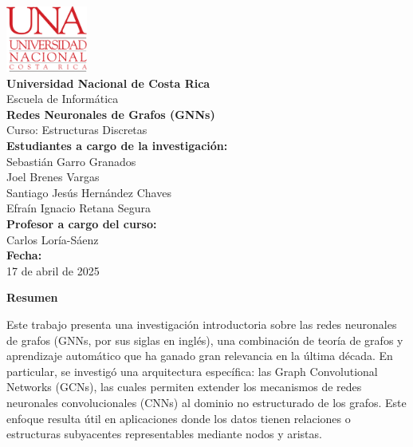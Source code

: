 \documentclass[11pt]{article} %
\begin{document}
\begin{titlepage}
    \thispagestyle{empty}
    \begin{spacing}{1.5}
    \begin{center}
        \includegraphics[width=0.2\textwidth]{Images/LogoUNA.svg.png} \\[30pt]
        {\Large \textbf{Universidad Nacional de Costa Rica}} \\[20pt] 
        {\Large Escuela de Informática} \\[20pt]
        {\Large \textbf{Redes Neuronales de Grafos (GNNs)}} \\[20pt]
        {\Large Curso: Estructuras Discretas} \\[20pt]
        {\Large \textbf{Estudiantes a cargo de la investigación:}} \\[10pt]
        {\large Sebastián Garro Granados \\ Joel Brenes Vargas \\ Santiago Jesús Hernández Chaves \\ Efraín Ignacio Retana Segura} \\[20pt]
        {\Large \textbf{Profesor a cargo del curso:}} \\[15pt]
        {\large Carlos Loría-Sáenz} \\[120pt]
        {\Large \textbf{Fecha:}} \\[15pt]
        {\large 17 de abril de 2025}
    \end{center}
    \end{spacing}
\end{titlepage}

\newpage
{\large \textbf{Resumen}}  
\vspace{5pt}

Este trabajo presenta una investigación introductoria sobre las redes neuronales de grafos (GNNs, por sus siglas en inglés), una combinación de teoría de grafos y aprendizaje automático que ha ganado gran relevancia en la última década. En particular, se investigó una arquitectura específica: las Graph Convolutional Networks (GCNs), las cuales permiten extender los mecanismos de redes neuronales convolucionales (CNNs) al dominio no estructurado de los grafos. Este enfoque resulta útil en aplicaciones donde los datos tienen relaciones o estructuras subyacentes representables mediante nodos y aristas.
\end{document}
